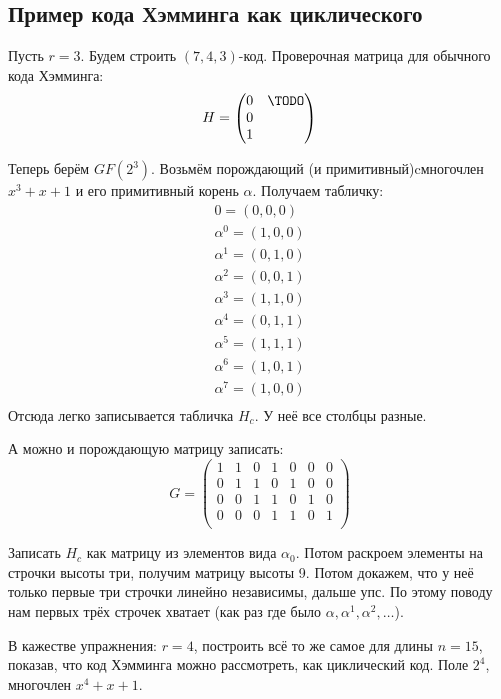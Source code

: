 \subsection{Пример кода Хэмминга как циклического}
Пусть $r=3$.
Будем строить $(7, 4, 3)$-код.
Проверочная матрица для обычного кода Хэмминга:
\[
H = {\begin{pmatrix}
0 & \TODO \\
0 & \\
1 & \\
\end{pmatrix}}
\]

Теперь берём $GF(2^3)$.
Возьмём порождающий (и примитивный)cмногочлен $x^3+x+1$ и его примитивный корень $\alpha$.
Получаем табличку:
\begin{align*}
0 = (0, 0, 0) \\
\alpha^0 = (1, 0, 0) \\
\alpha^1 = (0, 1, 0) \\
\alpha^2 = (0, 0, 1) \\
\alpha^3 = (1, 1, 0) \\
\alpha^4 = (0, 1, 1) \\
\alpha^5 = (1, 1, 1) \\
\alpha^6 = (1, 0, 1) \\
\alpha^7 = (1, 0, 0) \\
\end{align*}
Отсюда легко записывается табличка $H_c$.
У неё все столбцы разные.

А можно и порождающую матрицу записать:
\[
G=\begin{pmatrix}
1 & 1 & 0 & 1 & 0 & 0 & 0 \\
0 & 1 & 1 & 0 & 1 & 0 & 0 \\
0 & 0 & 1 & 1 & 0 & 1 & 0 \\
0 & 0 & 0 & 1 & 1 & 0 & 1 \\
\end{pmatrix}
\]

\begin{Exercise}
Записать $H_c$ как матрицу из элементов вида $\alpha_0$.
Потом раскроем элементы на строчки высоты три, получим матрицу высоты 9.
Потом докажем, что у неё только первые три строчки линейно независимы, дальше упс.
По этому поводу нам первых трёх строчек хватает (как раз где было $\alpha, \alpha^1, \alpha^2, \dots$).
\end{Exercise}

\begin{Exercise}
В кажестве упражнения: $r=4$, построить всё то же самое для длины $n=15$,
показав, что код Хэмминга можно рассмотреть, как циклический код.
Поле $2^4$, многочлен $x^4+x+1$.
\end{Exercise}
